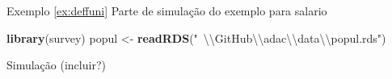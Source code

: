 \documentclass[]{book}
\newenvironment{Shaded}{\begin{snugshade}}{\end{snugshade}}
\newcommand{\KeywordTok}[1]{\textcolor[rgb]{0.13,0.29,0.53}{\textbf{{#1}}}}
\newcommand{\DecValTok}[1]{\textcolor[rgb]{0.00,0.00,0.81}{{#1}}}
\newcommand{\CharTok}[1]{\textcolor[rgb]{0.31,0.60,0.02}{{#1}}}
\newcommand{\StringTok}[1]{\textcolor[rgb]{0.31,0.60,0.02}{{#1}}}
\newcommand{\NormalTok}[1]{{#1}}
\numberwithin{example}{chapter}
\numberwithin{remark}{chapter}
\numberwithin{definition}{chapter}
\begin{document}
Exemplo \ref{ex:deffuni} Parte de simulação do exemplo para salario

\begin{Shaded}
\begin{Highlighting}[]
\KeywordTok{library}\NormalTok{(survey)}
\NormalTok{popul <-}\StringTok{ }\KeywordTok{readRDS}\NormalTok{(}\StringTok{"~}\CharTok{\textbackslash{}\textbackslash{}}\StringTok{GitHub}\CharTok{\textbackslash{}\textbackslash{}}\StringTok{adac}\CharTok{\textbackslash{}\textbackslash{}}\StringTok{data}\CharTok{\textbackslash{}\textbackslash{}}\StringTok{popul.rds"}\NormalTok{)}
\end{Highlighting}
\end{Shaded}

\begin{Shaded}
\end{Shaded}

Simulação (incluir?)
\end{document}
